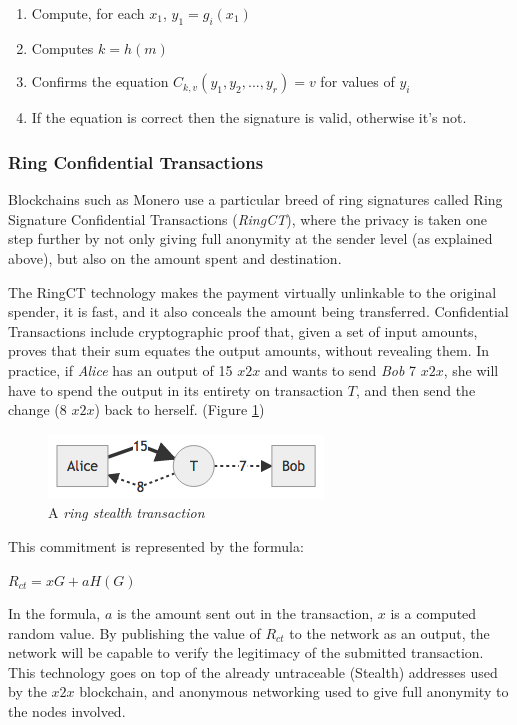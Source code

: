 \begin{enumerate}
\item Compute, for each $x_1$, $y_1=g_i(x_1)$
\item Computes $k=h(m)$
\item Confirms the equation $C_{k,v}(y_1,y_2, ..., y_r)=v$ for values of $y_i$
\item If the equation is correct then the signature is valid, otherwise it's not.
\end{enumerate}

\subsubsection{Ring Confidential Transactions}

Blockchains such as Monero use a particular breed of ring signatures called Ring Signature Confidential Transactions (\textit{RingCT}), where the privacy is taken one step further by not only giving full anonymity at the sender level (as explained above), but also on the amount spent and destination.

The RingCT technology makes the payment virtually unlinkable to the original spender, it is fast, and it also  conceals the amount being transferred. Confidential Transactions include cryptographic proof that, given a set of input amounts, proves that their sum equates the output amounts, without revealing them. In practice, if \textit{Alice} has an output of 15 $x2x$ and wants to send \textit{Bob} 7 $x2x$, she will have to spend the output in its entirety on transaction $T$, and then send the change (8 $x2x$) back to herself. (Figure \ref{fig:ringtx})

\begin{figure}
\includegraphics[scale=0.7]{ringtx}
\caption{A \textit{ring stealth transaction}}
\label{fig:ringtx}
\end{figure}

This commitment is represented by the formula: 

$R_{ct}=xG + aH(G)$

In the formula, $a$ is the amount sent out in the transaction, $x$ is a computed random value. By publishing the value of $R_{ct}$ to the network as an output, the network will be capable to verify the legitimacy of the submitted transaction. This technology goes on top of the already untraceable (Stealth) addresses used by the $x2x$ blockchain, and anonymous networking used to give full anonymity to the nodes involved.

